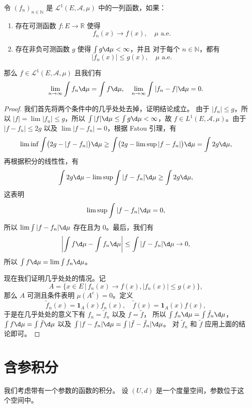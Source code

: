 \documentclass[fontset=none]{Notes}
\newcommand{\indicator}[1]{\mathbold 1_{#1}}
\newcommand{\alev}[1]{\text{$#1$ a.e.}}
\begin{document}
\begin{theorem}[控制收敛定理]
  令 $(f_n)_{n\in \mathbb{N}}$ 是 $\mathcal{L}^1(E,\mathcal{A},\mu)$
  中的一列函数，如果：
  \begin{enumerate}
    \item 存在可测函数 $f:E\to \mathbb{R}$ 使得
    \[
      f_n(x)\to f(x),\quad\alev{\mu}  
    \]
    \item 存在非负可测函数 $g$ 使得 $\int g\d\mu<\infty$，并且
    对于每个 $n\in \mathbb{N}$，都有
    \[
      |f_n(x)|\leq g(x),\quad \alev{\mu}   
    \]
  \end{enumerate}
  那么 $f\in \mathcal{L}^1(E,\mathcal{A},\mu)$ 且我们有
  \[
    \lim_{n\to\infty}\int f_n\d\mu=\int f\d\mu,\quad
    \lim_{n\to\infty}\int |f_n-f|\d\mu=0.  
  \]
\end{theorem}
\begin{proof}
  我们首先将两个条件中的几乎处处去掉，证明结论成立。
  由于 $|f_n|\leq g$，所以 $|f|=\lim|f_n|\leq g$，所以
  $\int |f|\d\mu\leq \int g\d\mu<\infty$，故
  $f\in L^1(E,\mathcal{A},\mu)$。由于 $|f-f_n|\leq 2g$
  以及 $\lim |f-f_n|=0$，根据 Fatou 引理，有
  \[
    \liminf \int\bigl(2g-|f-f_n|\bigr)\d\mu\geq
    \int \bigl(2g-\limsup|f-f_n|\bigr)\d\mu 
    =\int 2g\d\mu,
  \]
  再根据积分的线性性，有
  \[
    \int 2g\d\mu-\limsup\int|f-f_n|\d\mu\geq \int 2g\d\mu,  
  \]
  这表明
  \[
    \limsup\int |f-f_n|\d\mu = 0,  
  \]
  所以 $\lim \int |f-f_n|\d\mu$ 存在且为 $0$。最后，我们有
  \[
    \left|\int f\d\mu-\int f_n\d\mu\right|\leq \int |f-f_n|\d\mu\to 0,
  \]
  所以 $\int f\d\mu=\lim\int f_n\d\mu$。

  现在我们证明几乎处处的情况。记
  \[
    A=\big\{x\in E\,|\, f_n(x)\to f(x),|f_n(x)|\leq g(x)\big\}  ,
  \]
  那么 $A$ 可测且条件表明 $\mu(A^c)=0$。定义
  \[
    \tilde f_n(x)=\indicator{A}(x)f_n(x),\quad \tilde{f}(x)=\indicator{A}(x)f(x),  
  \]
  于是在几乎处处的意义下有 $f_n=\tilde{f}_n$ 以及 $f=\tilde{f}$，
  所以 $\int f_n\d\mu=\int\tilde{f}_n\d\mu$，
  $\int f\d\mu=\int\tilde f\d\mu$ 以及 $\int|f-f_n|\d\mu=\int|\tilde f-\tilde f_n|\d\mu$。
  对 $\tilde{f}_n$ 和 $\tilde{f}$ 应用上面的结论即可。
\end{proof}

\section{含参积分}

我们考虑带有一个参数的函数的积分。
设 $(U,d)$ 是一个度量空间，参数位于这个空间中。
\end{document}
